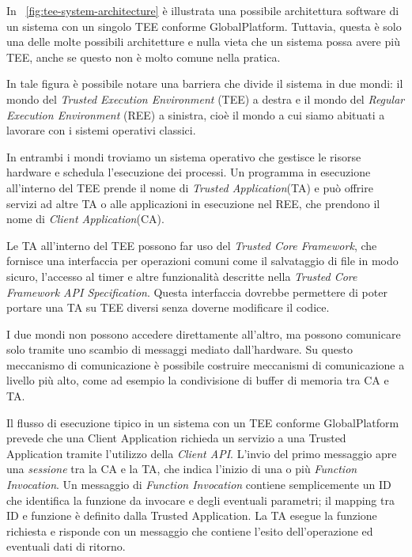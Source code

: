 \documentclass[12pt,italian]{report}
\begin{document}
In \figurename~\ref{fig:tee-system-architecture} è illustrata una possibile
architettura software di un sistema con un singolo TEE conforme
GlobalPlatform. Tuttavia, questa è solo una delle molte possibili
architetture e nulla vieta che un sistema possa avere più TEE, anche se
questo non è molto comune nella pratica.

In tale figura è possibile notare una barriera che divide il sistema in due
mondi: il mondo del \textit{Trusted Execution Environment} (TEE) a destra
e il mondo del \textit{Regular Execution Environment} (REE) a sinistra, cioè
il mondo a cui siamo abituati a lavorare con i sistemi operativi classici.

In entrambi i mondi troviamo un sistema operativo che gestisce le risorse
hardware e schedula l'esecuzione dei processi. Un programma in esecuzione
all'interno del TEE prende il nome di \textit{Trusted Application}(TA) e può
offrire servizi ad altre TA o alle applicazioni in esecuzione nel REE,
che prendono il nome di \textit{Client Application}(CA).

Le TA all'interno del TEE possono far uso del \textit{Trusted Core Framework},
che fornisce una interfaccia per operazioni comuni come il salvataggio
di file in modo sicuro, l'accesso al timer e altre funzionalità descritte
nella
\textit{Trusted Core Framework API Specification}\cite{gp2020internalapi}.
Questa interfaccia dovrebbe permettere di poter portare una TA su TEE diversi
senza doverne modificare il codice.

I due mondi non possono accedere direttamente all'altro, ma possono
comunicare solo tramite uno scambio di messaggi mediato dall'hardware.
Su questo meccanismo di comunicazione è possibile costruire meccanismi di
comunicazione a livello più alto, come ad esempio la condivisione di buffer
di memoria tra CA e TA.

\bigbreak \noindent

Il flusso di esecuzione tipico in un sistema con un TEE conforme GlobalPlatform
prevede che una Client Application richieda un servizio a
una Trusted Application tramite l'utilizzo della \textit{Client API}.
L'invio del primo messaggio apre una \textit{sessione} tra la CA e la TA, che
indica l'inizio di una o più \textit{Function Invocation}.
Un messaggio di \textit{Function Invocation} contiene semplicemente un ID
che identifica la funzione da invocare e degli eventuali parametri;
il mapping tra ID e funzione è definito dalla Trusted Application.
La TA esegue la funzione richiesta e risponde con un messaggio che contiene
l'esito dell'operazione ed eventuali dati di ritorno.
\end{document}
